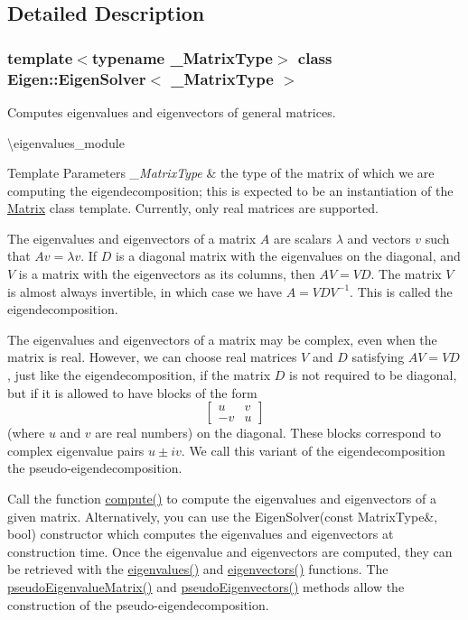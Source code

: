 \subsection{Detailed Description}
\subsubsection*{template$<$typename \+\_\+\+Matrix\+Type$>$\newline
class Eigen\+::\+Eigen\+Solver$<$ \+\_\+\+Matrix\+Type $>$}

Computes eigenvalues and eigenvectors of general matrices. 

\textbackslash{}eigenvalues\+\_\+module


\begin{DoxyTemplParams}{Template Parameters}
{\em \+\_\+\+Matrix\+Type} & the type of the matrix of which we are computing the eigendecomposition; this is expected to be an instantiation of the \mbox{\hyperlink{class_eigen_1_1_matrix}{Matrix}} class template. Currently, only real matrices are supported.\\
\hline
\end{DoxyTemplParams}
The eigenvalues and eigenvectors of a matrix $ A $ are scalars $ \lambda $ and vectors $ v $ such that $ Av = \lambda v $. If $ D $ is a diagonal matrix with the eigenvalues on the diagonal, and $ V $ is a matrix with the eigenvectors as its columns, then $ A V = V D $. The matrix $ V $ is almost always invertible, in which case we have $ A = V D V^{-1} $. This is called the eigendecomposition.

The eigenvalues and eigenvectors of a matrix may be complex, even when the matrix is real. However, we can choose real matrices $ V $ and $ D $ satisfying $ A V = V D $, just like the eigendecomposition, if the matrix $ D $ is not required to be diagonal, but if it is allowed to have blocks of the form \[ \begin{bmatrix} u & v \\ -v & u \end{bmatrix} \] (where $ u $ and $ v $ are real numbers) on the diagonal. These blocks correspond to complex eigenvalue pairs $ u \pm iv $. We call this variant of the eigendecomposition the pseudo-\/eigendecomposition.

Call the function \mbox{\hyperlink{class_eigen_1_1_eigen_solver_a38d032b75b3e75640e3db42e7ab20c24}{compute()}} to compute the eigenvalues and eigenvectors of a given matrix. Alternatively, you can use the Eigen\+Solver(const Matrix\+Type\&, bool) constructor which computes the eigenvalues and eigenvectors at construction time. Once the eigenvalue and eigenvectors are computed, they can be retrieved with the \mbox{\hyperlink{class_eigen_1_1_eigen_solver_a114189009e42f5e03372a7a3dfa33b97}{eigenvalues()}} and \mbox{\hyperlink{class_eigen_1_1_eigen_solver_a66288022802172e3ee059283b26201d7}{eigenvectors()}} functions. The \mbox{\hyperlink{class_eigen_1_1_eigen_solver_a4979eafe0aeef06b19ada7fa5e19db17}{pseudo\+Eigenvalue\+Matrix()}} and \mbox{\hyperlink{class_eigen_1_1_eigen_solver_a4e796226f06e1f7347cf03a38755a155}{pseudo\+Eigenvectors()}} methods allow the construction of the pseudo-\/eigendecomposition.

